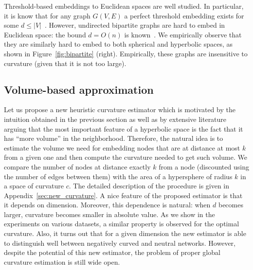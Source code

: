 \documentclass{article} %
\begin{document}
Threshold-based embeddings to Euclidean spaces are well studied. In particular, it is know that for any graph $G(V,E)$ a perfect threshold embedding  exists for some $d \le |V|$~\citep{maehara1984space}. 
However, undirected bipartite graphs are hard to embed in Euclidean space: the bound $d = O(n)$ is known~\citep{maehara1984space}. We empirically observe that they are similarly hard to embed to both spherical and hyperbolic spaces, as shown in Figure~\ref{fig:bipartite} (right). Empirically, these graphs are insensitive to curvature (given that it is not too large).
 
\subsection{Volume-based approximation}

Let us propose a new heuristic curvature estimator which is motivated by the intuition obtained in the previous section as well as by extensive literature arguing that the most important feature of a hyperbolic space is the fact that it has ``more volume'' in the neighborhood.
Therefore, the natural idea is to estimate the volume we need for embedding nodes that are at distance at most $k$ from a given one and then compute the curvature needed to get such volume. 
We compare the number of nodes at distance exactly $k$ from a node (discounted using the number of edges between them) with the area of a hypersphere of radius $k$ in a space of curvature $c$. The detailed description of the procedure is given in Appendix~\ref{sec:new_curvature}. 
A nice feature of the proposed estimator is that it depends on dimension. Moreover, this dependence is natural: when $d$ becomes larger, curvature becomes smaller in absolute value. As we show in the experiments on various datasets, a similar property is observed for the optimal curvature.
Also, it turns out that for a given dimension the new estimator is able to distinguish well between negatively curved and neutral networks.
However, despite the potential of this new estimator, the problem of proper global curvature estimation is still wide open.
 
\end{document}
